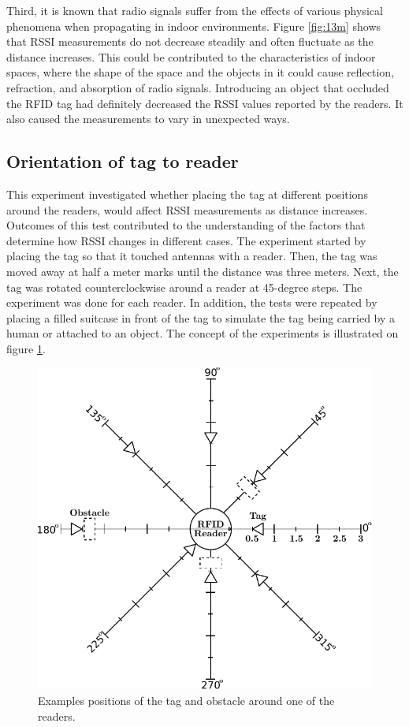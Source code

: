 Third, it is known that radio signals suffer from the effects of various physical phenomena when propagating in indoor environments. Figure \ref{fig:13m} shows that RSSI measurements do not decrease steadily and often fluctuate as the distance increases. This could be contributed to the characteristics of indoor spaces, where the shape of the space and the objects in it could cause reflection, refraction, and absorption of radio signals. Introducing an object that occluded the RFID tag had definitely decreased the RSSI values reported by the readers. It also caused the measurements to vary in unexpected ways.


\subsection{Orientation of tag to reader}

This experiment investigated whether placing the tag at different positions around the readers, would affect RSSI measurements as distance increases. Outcomes of this test contributed to the understanding of the factors that determine how RSSI changes in different cases. The experiment started by placing the tag so that it touched antennas with a reader. Then, the tag was moved away at half a meter marks until the distance was three meters. Next, the tag was rotated counterclockwise around a reader at 45-degree steps. The experiment was done for each reader. In addition, the tests were repeated by placing a filled suitcase in front of the tag to simulate the tag being carried by a human or attached to an object. The concept of the experiments is illustrated on figure \ref{fig:ori}.
\begin{figure}[h]
	\begin{center}
		\includegraphics[width=.5\textwidth]{figures/exp/orientation}
		\caption{Examples positions of the tag and obstacle around one of the readers.}
		\label{fig:ori}
	\end{center}
\end{figure}

